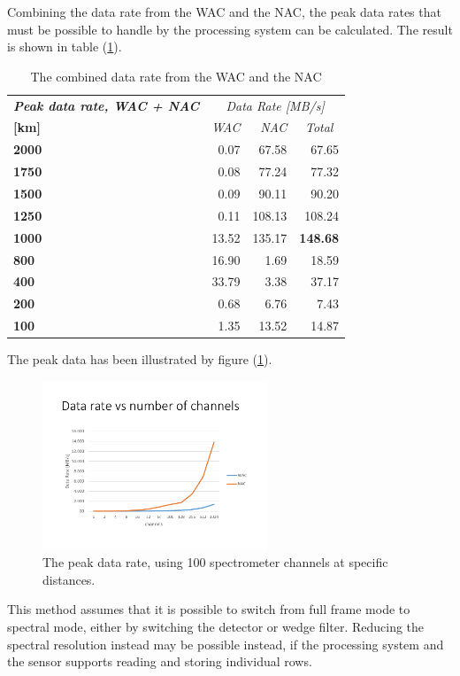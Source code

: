 Combining the data rate from the WAC and the NAC, the peak data rates that must be possible to handle by the processing system can be calculated. The result is shown in table (\ref{tab:peak_data_wac_nac}).
\begin{table}[htb]
  \centering
    \begin{tabular}{l|r|r|r|}
\textit{\textbf{Peak data rate, WAC + NAC}} & \multicolumn{3}{c|}{\textit{Data Rate [MB/s]}} \bigstrut[b]\\
\cline{1-1}\textbf{[km]} & \textit{WAC} & \textit{NAC} & \multicolumn{1}{c|}{\textit{Total}} \bigstrut\\
\hline
\textbf{2000} & 0.07  & \multicolumn{1}{r}{67.58} & 67.65 \bigstrut[t]\\
\textbf{1750} & 0.08  & \multicolumn{1}{r}{77.24} & 77.32 \\
\textbf{1500} & 0.09  & \multicolumn{1}{r}{90.11} & 90.20 \\
\textbf{1250} & 0.11  & \multicolumn{1}{r}{108.13} & 108.24 \\
\textbf{1000} & 13.52 & \multicolumn{1}{r}{135.17} & \textbf{148.68} \\
\textbf{800} & 16.90 & \multicolumn{1}{r}{1.69} & 18.59 \\
\textbf{400} & 33.79 & \multicolumn{1}{r}{3.38} & 37.17 \\
\textbf{200} & 0.68  & \multicolumn{1}{r}{6.76} & 7.43 \\
\textbf{100} & 1.35  & \multicolumn{1}{r}{13.52} & 14.87 \\
\end{tabular}%
    \caption{The combined data rate from the WAC and the NAC}
  \label{tab:peak_data_wac_nac}%
\end{table}%
The peak data has been illustrated by figure (\ref{fig:imaging_data_peak_throughput}).
\begin{figure}[htb]
\centering
\includegraphics[width=0.6\textwidth,page=2,trim=15mm 15mm 15mm 32mm,clip]{figures/Orbiter/Graphs_excel.pdf}
\caption{The peak data rate, using 100 spectrometer channels at specific distances.}
\label{fig:imaging_data_peak_throughput}
\end{figure}
This method assumes that it is possible to switch from full frame mode to spectral mode, either by switching the detector or wedge filter. Reducing the spectral resolution instead may be possible instead, if the processing system and the sensor supports reading and storing individual rows.

